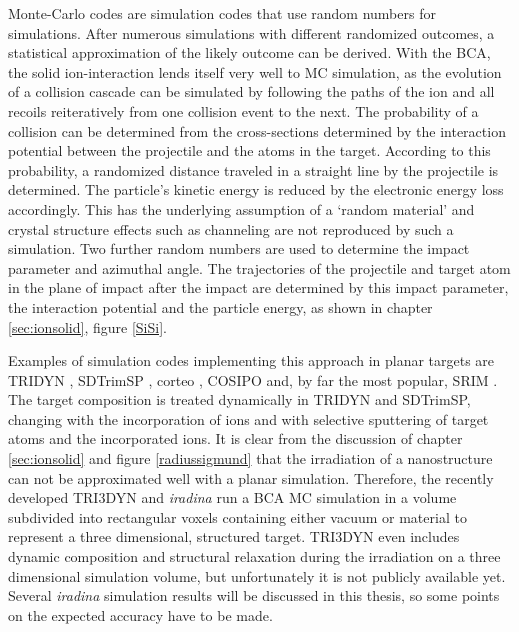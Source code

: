 Monte-Carlo codes are simulation codes that use random numbers for simulations. After numerous simulations with different randomized outcomes, a statistical approximation of the likely outcome can be derived. With the BCA, the solid ion-interaction lends itself very well to MC simulation, as the evolution of a collision cascade can be simulated by following the paths of the ion and all recoils reiteratively from one collision event to the next. The probability of a collision can be determined from the cross-sections determined by the interaction potential between the projectile and the atoms in the target. According to this probability, a randomized distance traveled in a straight line by the projectile is determined. The particle's kinetic energy is reduced by the electronic energy loss accordingly. This has the underlying assumption of a `random material' and crystal structure effects such as channeling are not reproduced by such a simulation. Two further random numbers are used to determine the impact parameter and azimuthal angle. The trajectories of the projectile and target atom in the plane of impact after the impact are determined by this impact parameter, the interaction potential and the particle energy, as shown in chapter \ref{sec:ionsolid}, figure \ref{SiSi}.

Examples of simulation codes implementing this approach in planar targets are TRIDYN \cite{moller_tridyn_1984}, SDTrimSP \cite{bizyukov_morphology_2008}, corteo \cite{schiettekatte_fast_2008}, COSIPO \cite{hautala_nuclear_1984} and, by far the most popular, SRIM \cite{ziegler_srim_2012}. The target composition is treated dynamically in TRIDYN and SDTrimSP, changing with the incorporation of ions and with selective sputtering of target atoms and the incorporated ions. It is clear from the discussion of chapter \ref{sec:ionsolid} and figure \ref{radiussigmund} that the irradiation of a nanostructure can not be approximated well with a planar simulation. Therefore, the recently developed TRI3DYN \cite{moller_tri3dyn_2014} and \emph{iradina} \cite{borschel_ion_2011} run a BCA MC simulation in a volume subdivided into rectangular voxels containing either vacuum or material to represent a three dimensional, structured target. TRI3DYN even includes dynamic composition and structural relaxation during the irradiation on a three dimensional simulation volume, but unfortunately it is not publicly available yet. Several \emph{iradina} simulation results will be discussed in this thesis, so some points on the expected accuracy have to be made. 

